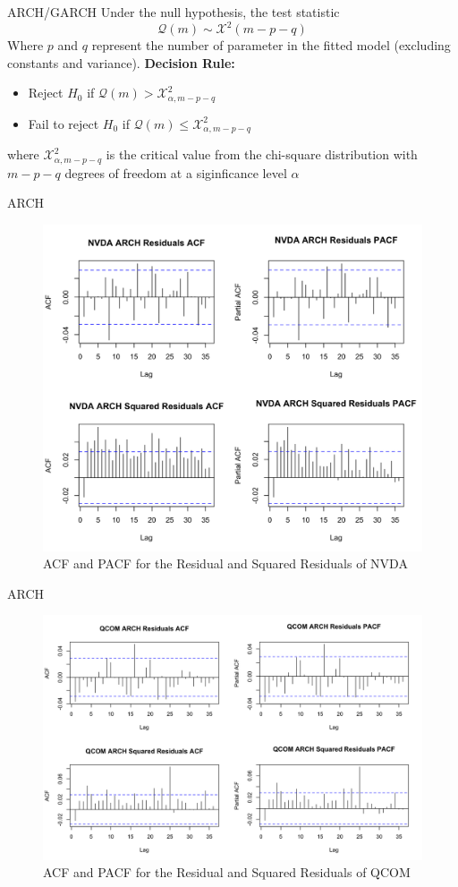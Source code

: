 \documentclass{beamer}[9pt]
\begin{document}
\begin{frame}{ARCH/GARCH}
	Under the null hypothesis, the test statistic 
	\[
	\mathcal{Q}(m)\sim\mathcal{X}^2(m-p-q)
	\]
	Where $p$ and $q$ represent the number of parameter in the fitted model (excluding constants and variance).
	\newline
	\textbf{Decision Rule:}
	\begin{itemize}
		\item Reject $H_0$ if $\mathcal{Q}(m)>\mathcal{X}^2_{\alpha, m-p-q}$
		\item Fail to reject $H_0$ if $\mathcal{Q}(m)\leq \mathcal{X}^2_{\alpha, m-p-q}$
	\end{itemize}
	where $ \mathcal{X}^2_{\alpha, m-p-q}$ is the critical value from the chi-square distribution with $m-p-q$ degrees of freedom at a siginficance level $\alpha$
\end{frame}

\begin{frame}{ARCH}
	\begin{figure}[!h]
		\centering
		\includegraphics[width=0.65\linewidth]{plots/ARCH_NVDA.png}
		\caption{ACF and PACF for the Residual and Squared Residuals of NVDA}
	\end{figure}
\end{frame}

\begin{frame}{ARCH}
	\begin{figure}[!h]
		\centering
		\includegraphics[width=0.8\linewidth]{plots/ARCH_QCOM.png}
		\caption{ACF and PACF for the Residual and Squared Residuals of QCOM}
	\end{figure}
\end{frame}
\end{document}
